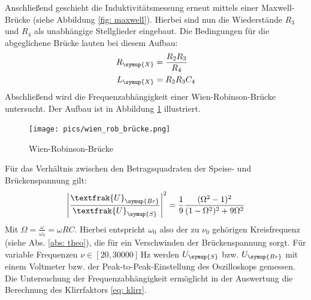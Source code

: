 Anschließend geschieht die Induktivitätsmessung erneut mittels einer Maxwell-Brücke (siehe Abbildung \ref{fig: maxwell}).
Hierbei sind nun die Wiederstände $R_3$ und $R_4$ als unabhängige Stellglieder eingebaut. Die Bedingungen für die abgeglichene Brücke lauten
bei diesem Aufbau:
\begin{align}
  \begin{aligned}
    R_{\symup{X}} &=\frac{R_2 R_3}{R_4} \\
    L_{\symup{X}} &= R_2 R_3 C_4
  \end{aligned}
  \label{eq: Lx_maxwell}
\end{align}
Abschließend wird die Frequenzabhängigkeit einer Wien-Robinson-Brücke untersucht. Der Aufbau ist in Abbildung
 \ref{fig: wienrob} illustriert.
\begin{figure}
  \centering
  \texttt{[image: pics/wien\_rob\_brücke.png]}
  \caption{Wien-Robinson-Brücke\cite{anleitung302}}
  \label{fig: wienrob}
\end{figure}
Für das Verhältnis zwischen den Betragsquadraten der Speise- und Brückenspannung gilt:
\begin{equation}
  \left| \frac{\textfrak{U}_{\symup{Br}}}{\textfrak{U}_{\symup{S}}}\right|^2 = \frac{1}{9} \frac{(\Omega^2 - 1)^2 }{(1 - \Omega ^2)^2 + 9 \Omega ^2}
\end{equation}
Mit $\Omega = \frac{\omega}{\omega_0} = \omega R C$. Hierbei entspricht $\omega_0$ also der zu $\nu_0$ gehörigen Kreisfrequenz (siehe Abs. \ref{abs: theo}), die
für ein Verschwinden der Brückenspannung sorgt. Für variable Frequenzen $\nu \in [20, \num{30000}]\,\si{\hertz}$ werden $U_{\symup{S}}$ bzw. $U_{\symup{Br}}$ mit einem
Voltmeter bzw. der Peak-to-Peak-Einstellung des Oszilloskops gemessen. Die Untersuchung der Frequenzabhängigkeit
 ermöglicht in der Auswertung die Berechnung des Klirrfaktors \eqref{eq: klirr}.
